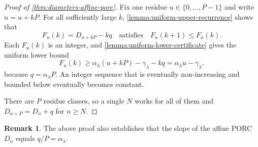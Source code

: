 \documentclass[DIV=12,10pt]{scrartcl}
\theoremstyle{definition}
\newtheorem{remark}{Remark}
\begin{document}
\begin{proof}[Proof of \cref{thm:diameters-affine-porc}]
Fix one residue $u\in\{0,\ldots,P-1\}$ and write $n=u+kP$. For all sufficiently large $k$, \cref{lemma:uniform-upper-recurrence} shows that
\[
	F_u(k) = D_{u+kP} - kq \quad \text{satisfies} \quad F_u(k+1)\leqslant F_u(k).
\]
Each $F_u(k)$ is an integer, and \cref{lemma:uniform-lower-certificate} gives the uniform lower bound
\[
	F_u(k) \geqslant \alpha_\lambda (u+kP) - \gamma_\lambda - kq = \alpha_\lambda u - \gamma_\lambda,
\]
because $q=\alpha_\lambda P$. An integer sequence that is eventually non-increasing and bounded below eventually becomes constant.

There are $P$ residue classes, so a single $N$ works for all of them and $D_{n+P} = D_n+q$ for $n\geqslant N$.
\end{proof}
\begin{remark}
	The above proof also establishes that the slope of the affine PORC $D_n$ equals $q/P = \alpha_\lambda$.
\end{remark}
\end{document}
